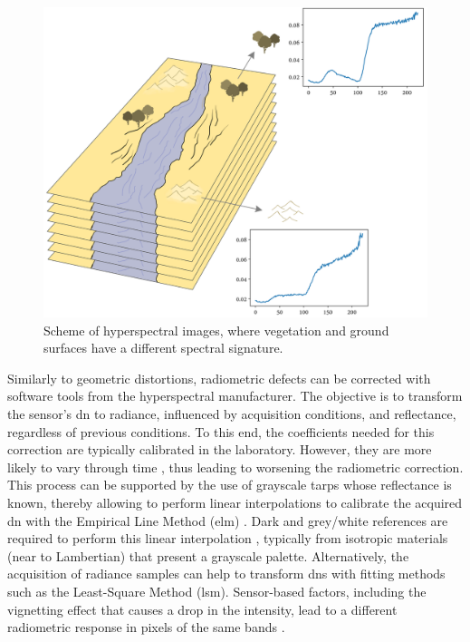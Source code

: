 \begin{figure}[ht]
	\includegraphics[width=\textwidth]{figs/fundamentals/material_hyperspectral.png}
	\caption{Scheme of hyperspectral images, where vegetation and ground surfaces have a different spectral signature.  }
    \label{fig:fundamentals_material_hyperspectral}
\end{figure}

Similarly to geometric distortions, radiometric defects can be corrected with software tools from the hyperspectral manufacturer. The objective is to transform the sensor's \acrshort{dn} to radiance, influenced by acquisition conditions, and reflectance, regardless of previous conditions. To this end, the coefficients needed for this correction are typically calibrated in the laboratory. However, they are more likely to vary through time \cite{adao_hyperspectral_2017}, thus leading to worsening the radiometric correction. This process can be supported by the use of grayscale tarps whose reflectance is known, thereby allowing to perform linear interpolations to calibrate the acquired \acrshort{dn} \cite{lucieer_hyperuasimaging_2014} with the Empirical Line Method (\acrshort{elm}) \cite{aasen_quantitative_2018, sousa_uav-based_2022}. Dark and grey/white references are required to perform this linear interpolation \cite{jakob_need_2017, sagan_data-driven_2022, duan_land_2013}, typically from isotropic materials (near to Lambertian) that present a grayscale palette. Alternatively, the acquisition of radiance samples can help to transform \acrshort{dn}s with fitting methods such as the Least-Square Method (\acrshort{lsm}). Sensor-based factors, including the vignetting effect that causes a drop in the intensity, lead to a different radiometric response in pixels of the same bands \cite{yang_dom_2017}.

